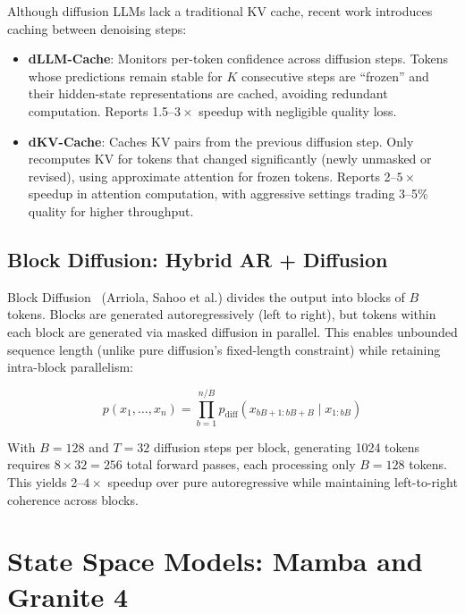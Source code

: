 \documentclass[11pt,letterpaper]{article}
\begin{document}
Although diffusion LLMs lack a traditional KV cache, recent work introduces caching between denoising steps:

\begin{itemize}[noitemsep]
    \item \textbf{dLLM-Cache}: Monitors per-token confidence across diffusion steps. Tokens whose predictions remain stable for $K$ consecutive steps are ``frozen'' and their hidden-state representations are cached, avoiding redundant computation. Reports 1.5--$3\times$ speedup with negligible quality loss.

    \item \textbf{dKV-Cache}: Caches KV pairs from the previous diffusion step. Only recomputes KV for tokens that changed significantly (newly unmasked or revised), using approximate attention for frozen tokens. Reports 2--$5\times$ speedup in attention computation, with aggressive settings trading 3--5\% quality for higher throughput.
\end{itemize}

\subsection{Block Diffusion: Hybrid AR + Diffusion}

Block Diffusion~\cite{block-diffusion} (Arriola, Sahoo et al.) divides the output into blocks of $B$ tokens. Blocks are generated autoregressively (left to right), but tokens within each block are generated via masked diffusion in parallel. This enables unbounded sequence length (unlike pure diffusion's fixed-length constraint) while retaining intra-block parallelism:

\begin{equation}
    p(x_1, \ldots, x_n) = \prod_{b=1}^{n/B} p_{\text{diff}}(x_{bB+1:bB+B} \mid x_{1:bB})
    \label{eq:block-diff}
\end{equation}

With $B=128$ and $T=32$ diffusion steps per block, generating 1024 tokens requires $8 \times 32 = 256$ total forward passes, each processing only $B=128$ tokens. This yields 2--$4\times$ speedup over pure autoregressive while maintaining left-to-right coherence across blocks.

\section{State Space Models: Mamba and Granite 4}
\label{sec:mamba}
\end{document}
